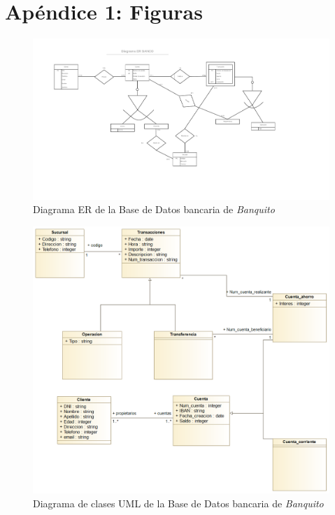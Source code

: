 \documentclass[11pt,a4paper]{article}
\begin{document}
\newpage
\section{Apéndice 1: Figuras}

\begin{landscape}
\begin{figure}
\centering
\includegraphics[scale=0.75]{images/diagramaer.png}
\caption{Diagrama ER de la Base de Datos bancaria de \emph{Banquito}}
\label{fig:diagramaer}
\end{figure}
\end{landscape}

\begin{figure}
\centering
\includegraphics[scale=0.45]{images/diagramauml.png}
\caption{Diagrama de clases UML de la Base de Datos bancaria de \emph{Banquito}}
\label{fig:diagramauml}
\end{figure}
\end{document}
